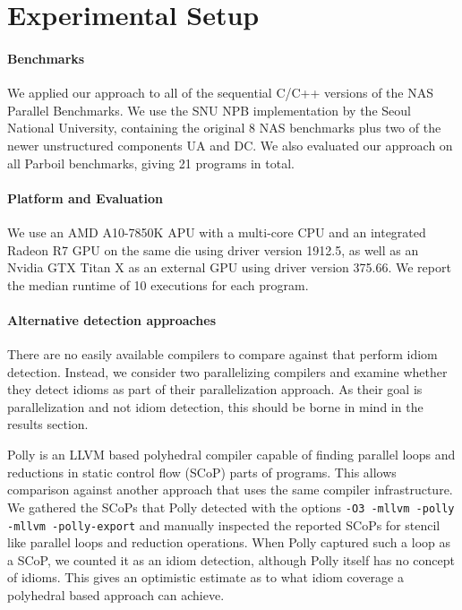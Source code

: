 \section{Experimental Setup}

    \paragraph*{Benchmarks}
    We applied our approach to all of the sequential C/C++ versions of the NAS
    Parallel Benchmarks.
    We use the SNU NPB implementation by the Seoul National University,
    containing the original 8 NAS benchmarks plus two of the newer unstructured
    components UA and DC.
    We also evaluated our approach on all Parboil benchmarks, giving 21 programs
    in total. 

    \paragraph*{Platform and Evaluation}
    We use an AMD A10-7850K APU with a multi-core CPU and an integrated Radeon
    R7 GPU on the same die using driver version 1912.5, as well as an Nvidia GTX
    Titan X as an external GPU using driver version 375.66.
    We report the median runtime of 10 executions for each program.

    \paragraph*{Alternative detection approaches}
    \hspace{0.2cm}There are no easily available compilers to compare against
    that perform idiom detection.
    Instead, we consider two parallelizing compilers and examine
    whether they detect idioms as part of their parallelization approach.
    As their goal is parallelization and not idiom detection, this should be
    borne in mind in the results section.

    Polly \cite{Doerfert2015Polly} is an LLVM based polyhedral compiler
    capable of finding parallel loops and reductions in static control
    flow (SCoP) parts of programs.  This allows comparison against
    another approach that uses the same compiler infrastructure.
    We gathered the SCoPs that Polly detected with the options
    \texttt{-O3 -mllvm -polly -mllvm -polly-export} and manually inspected
    the reported SCoPs for stencil like parallel loops and reduction operations.
    When Polly captured such a loop as a SCoP, we counted it as an idiom
    detection, although Polly itself has no concept of idioms.
    This gives an optimistic estimate as to what idiom coverage a polyhedral
    based approach can achieve.

